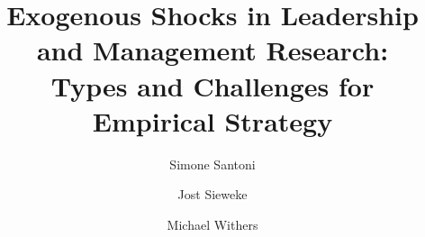 \usepackage{array}
\usepackage{booktabs}
\usepackage{dcolumn}
\usepackage{pgf}
\usepackage{lmodern}
\usepackage{import}
\usepackage{pgfplots}
\pgfplotsset{compat=1.16}
\usepackage[utf8]{inputenc}
\usepackage{tikz}
\usepackage{threeparttable}
\usepackage{graphicx}
\usepackage{rotating}
\usepackage{caption}
\captionsetup[table]{labelfont=sc, labelsep=newline}
\renewcommand{\figurename}{\itshape Fig.}
\renewcommand{\thetable}{\Roman{table}}
\usepackage{csquotes}
\usepackage{pdflscape}

\usepackage{amssymb}

\usepackage[toc, page]{appendix}





\title{Exogenous Shocks in Leadership and Management Research:\\
Types and Challenges for Empirical Strategy\vspace{2em}}

\author[$\bullet\circ$]{Simone Santoni}
\author[$\star$]{Jost Sieweke}
\author[$\diamond$]{Michael Withers}

\renewcommand\Authands{ and }
\renewcommand\Affilfont{\normalsize}


